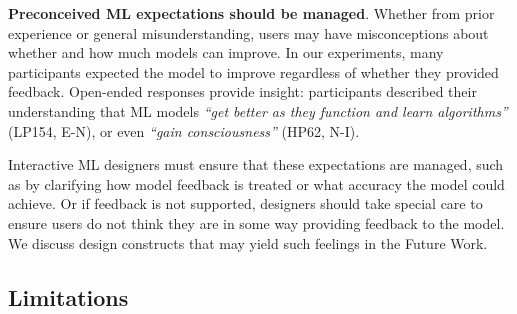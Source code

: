 \textbf{Preconceived ML expectations should be managed}.
Whether from prior experience or general misunderstanding, users may have misconceptions about whether and how much models can improve. In our experiments, many participants expected the model to improve regardless of whether they provided feedback. 
%
Open-ended responses provide insight: participants described their understanding that ML models  %
\textit{``get better as they function and learn algorithms''} (LP154, E-N), or even \textit{``gain consciousness''} (HP62, N-I).
%

Interactive ML designers must ensure that these expectations are managed, such as by clarifying how model feedback is treated or what accuracy the model could achieve. Or if feedback is not supported, designers should take special care to ensure users do not think they are in some way providing feedback to the model. We discuss design constructs that may yield such feelings in the Future Work.



\subsection{Limitations}


